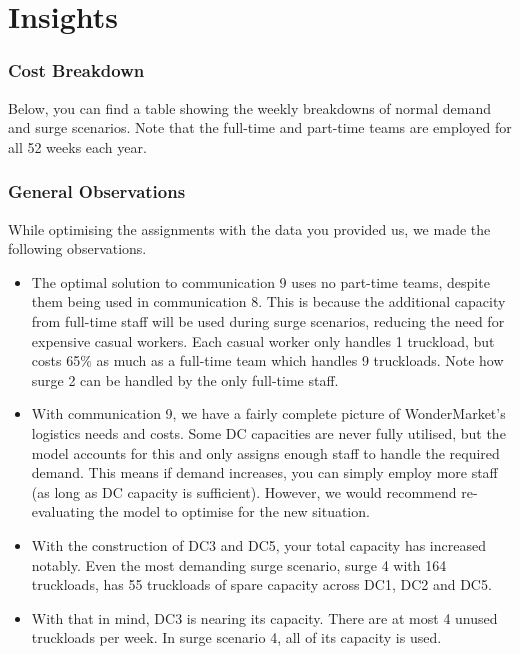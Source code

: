 \documentclass[11pt,a4paper]{article}
\begin{document}
\newpage
\part{Insights}
\section{Cost Breakdown}
Below, you can find a table showing the weekly breakdowns of normal 
demand and surge scenarios. Note that the full-time and part-time 
teams are employed for all 52 weeks each year. \\[1.5em]


\section{General Observations}
While optimising the assignments with the data you provided us, we made 
the following observations.
\begin{itemize}
    \item The optimal solution to communication 9 uses no part-time teams, despite 
    them being used in communication 8. This is because the additional 
    capacity from full-time staff will be used during surge
     scenarios, reducing the need for expensive casual workers. Each casual worker only 
     handles 1 truckload, but costs 65\% as much as a full-time team which handles 
     9 truckloads. Note how 
     surge 2 can be handled by the only full-time staff.
    \item With communication 9, we have a fairly complete picture of WonderMarket's
    logistics needs and costs. Some DC capacities are never fully utilised, 
    but the model accounts for this and only assigns enough staff to handle 
    the required demand. This means if demand increases, you can simply employ more 
    staff (as long as DC capacity is sufficient). However, we would recommend
    re-evaluating the model to optimise for the new situation.
    \item With the construction of DC3 and DC5, your total capacity has increased 
    notably. Even the most demanding surge scenario, surge 4 with 164 truckloads,
    has 55 truckloads of spare capacity across DC1, DC2 and DC5.
    \item With that in mind, DC3 is nearing its capacity. There are at most  
    4 unused truckloads per week. In surge scenario 4, all of its 
    capacity is used. 
\end{itemize}
\end{document}
